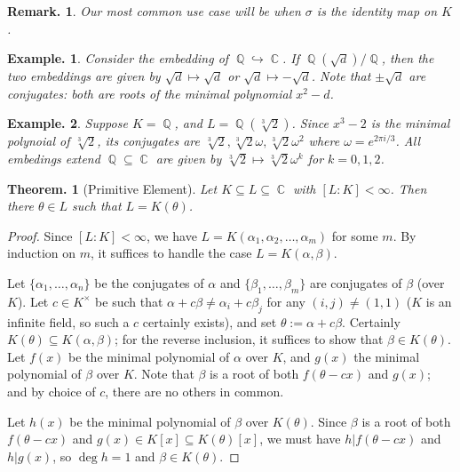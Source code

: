 \documentclass[11pt, a4paper]{memoir}
\DeclareMathOperator{\Q}{{\mathbb{Q}}}
\DeclareMathOperator{\C}{{\mathbb{C}}}
\newcommand{\hto}[0]{\ensuremath{\hookrightarrow}}
\theoremstyle{change}
\newtheorem{theorem}{Theorem.}[section]
\theoremstyle{plain}
\theoremstyle{nonumberplain}
\newtheorem{example}{Example.}
\newtheorem{remark}{Remark.}
\newtheorem{proof}{Proof}
\numberwithin{equation}{section}
\begin{document}
\begin{remark}
    Our most common use case will be when $\sigma$ is the identity map on $K$.
\end{remark}
\begin{example}
    Consider the embedding of $\Q\hto\C$.
    If $\Q(\sqrt{d})/\Q$, then the two embeddings are given by $\sqrt{d}\mapsto\sqrt{d}$ or $\sqrt{d}\mapsto-\sqrt{d}$.
    Note that $\pm\sqrt{d}$ are conjugates: both are roots of the minimal polynomial $x^2-d$.
\end{example}
\begin{example}
    Suppose $K=\Q$, and $L=\Q(\sqrt[3]{2})$.
    Since $x^3-2$ is the minimal polynoial of $\sqrt[3]{2}$, its conjugates are $\sqrt[3]{2},\sqrt[3]{2}\omega,\sqrt[3]{2}\omega^2$ where $\omega=e^{2\pi i/3}$.
    All embedings extend $\Q\subseteq\C$ are given by $\sqrt[3]{2}\mapsto\sqrt[3]{2}\omega^k$ for $k=0,1,2$.
\end{example}
\begin{theorem}[Primitive Element]
    Let $K\subseteq L\subseteq\C$ with $[L:K]<\infty$.
    Then there $\theta\in L$ such that $L=K(\theta)$.
\end{theorem}
\begin{proof}
    Since $[L:K]<\infty$, we have $L=K(\alpha_1,\alpha_2,\ldots,\alpha_m)$ for some $m$.
    By induction on $m$, it suffices to handle the case $L=K(\alpha,\beta)$.

    Let $\{\alpha_1,\ldots,\alpha_n\}$ be the conjugates of $\alpha$ and $\{\beta_1,\ldots,\beta_m\}$ are conjugates of $\beta$ (over $K$).
    Let $c\in K^\times$ be such that $\alpha+c\beta\neq\alpha_i+c\beta_j$ for any $(i,j)\neq(1,1)$ ($K$ is an infinite field, so such a $c$ certainly exists), and set $\theta:=\alpha+c\beta$.
    Certainly $K(\theta)\subseteq K(\alpha,\beta)$; for the reverse inclusion, it suffices to show that $\beta\in K(\theta)$.
    Let $f(x)$ be the minimal polynomial of $\alpha$ over $K$, and $g(x)$ the minimal polynomial of $\beta$ over $K$.
    Note that $\beta$ is a root of both $f(\theta-cx)$ and $g(x)$; and by choice of $c$, there are no others in common.

    Let $h(x)$ be the minimal polynomial of $\beta$ over $K(\theta)$.
    Since $\beta$ is a root of both $f(\theta-cx)$ and $g(x)\in K[x]\subseteq K(\theta)[x]$, we must have $h|f(\theta-cx)$ and $h|g(x)$, so $\deg h=1$ and $\beta\in K(\theta)$.
\end{proof}
\end{document}
